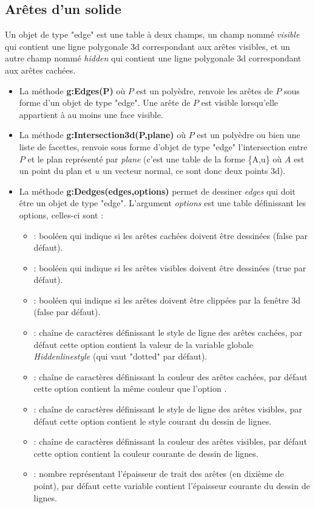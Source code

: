 \subsection{Arêtes d'un solide}

Un objet de type "edge" est une table à deux champs, un champ nommé \emph{visible} qui contient une ligne polygonale 3d correspondant aux arêtes visibles, et un autre champ nommé \emph{hidden} qui contient une ligne polygonale 3d correspondant aux arêtes cachées.

\begin{itemize}
    \item La méthode \textbf{g:Edges(P)} où $P$ est un polyèdre, renvoie les arêtes de $P$ sous forme d'un objet de type "edge". Une arête de $P$ est visible lorsqu'elle appartient à au moins une face visible.
    \item La méthode \textbf{g:Intersection3d(P,plane)} où $P$ est un polyèdre ou bien une liste de facettes, renvoie sous forme d'objet de type "edge" l'intersection entre $P$ et le plan représenté par \emph{plane} (c'est une table de la forme \{A,u\} où $A$ est un point du plan et $u$ un vecteur normal, ce sont donc deux points 3d).
    \item La méthode \textbf{g:Dedges(edges,options)} permet de dessiner \emph{edges} qui doit être un objet de type "edge". L'argument \emph{options} est une table définissant les options, celles-ci sont :
    \begin{itemize}
        \item {} : booléen qui indique si les arêtes cachées doivent être dessinées (false par défaut).
        \item {} : booléen qui indique si les arêtes visibles doivent être dessinées (true par défaut).
        \item {} : booléen qui indique si les arêtes doivent être clippées par la fenêtre 3d (false par défaut).
        \item {} : chaîne de caractères définissant le style de ligne des arêtes cachées, par défaut cette option contient la valeur de la variable globale \emph{Hiddenlinestyle} (qui vaut "dotted" par défaut).
        \item {} : chaîne de caractères définissant la couleur des arêtes cachées, par défaut cette option contient la même couleur que l'option .
        \item {} : chaîne de caractères définissant le style de ligne des arêtes visibles, par défaut cette option contient le style courant du dessin de lignes.
        \item {} : chaîne de caractères définissant la couleur des arêtes visibles, par défaut cette option contient la couleur courante de dessin de lignes.
        \item {} : nombre représentant l'épaisseur de trait des arêtes (en dixième de point), par défaut cette variable contient l'épaisseur courante du dessin de lignes.
    \end{itemize}


\end{itemize}
